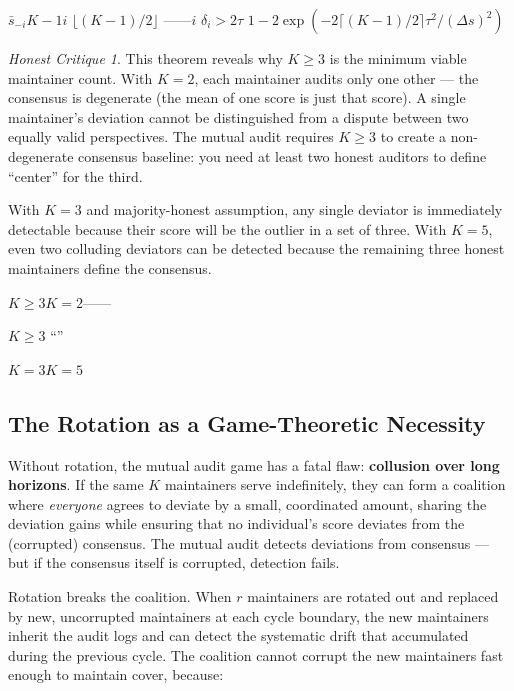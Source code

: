 \documentclass[12pt,a4paper]{article}
\theoremstyle{remark}
\newtheorem{honesthit}{Honest Critique}[section]
\newenvironment{hitbox}{%
  \begin{center}
  \color{red}
  \begin{minipage}{0.92\textwidth}
  \begin{honesthit}
}{%
  \end{honesthit}
  \end{minipage}
  \end{center}
}
\begin{document}
\noindent\textbf{}
$\bar{s}_{-i}$$K-1$\textbf{}$i$
$\lfloor (K-1)/2 \rfloor$
——$i$
$\delta_i > 2\tau$
$1 - 2\exp(-2\lceil (K-1)/2\rceil \tau^2/(\Delta s)^2)$

\begin{hitbox}
This theorem reveals why $K \geq 3$ is the minimum viable maintainer count.
With $K = 2$, each maintainer audits only one other — the consensus is degenerate
(the mean of one score is just that score). A single maintainer's deviation cannot
be distinguished from a dispute between two equally valid perspectives. The
mutual audit requires $K \geq 3$ to create a non-degenerate consensus baseline:
you need at least two honest auditors to define ``center'' for the third.

With $K = 3$ and majority-honest assumption, any single deviator is immediately
detectable because their score will be the outlier in a set of three. With
$K = 5$, even two colluding deviators can be detected because the remaining
three honest maintainers define the consensus.

\begin{center}
\small\textbf{}
$K \geq 3$$K=2$——

$K \geq 3$
“”

$K=3$$K=5$

\end{center}
\end{hitbox}

\subsection{The Rotation as a Game-Theoretic Necessity}

Without rotation, the mutual audit game has a fatal flaw: \textbf{collusion over
long horizons}. If the same $K$ maintainers serve indefinitely, they can form a
coalition where \textit{everyone} agrees to deviate by a small, coordinated
amount, sharing the deviation gains while ensuring that no individual's score
deviates from the (corrupted) consensus. The mutual audit detects deviations
from consensus — but if the consensus itself is corrupted, detection fails.

Rotation breaks the coalition. When $r$ maintainers are rotated out and replaced
by new, uncorrupted maintainers at each cycle boundary, the new maintainers
inherit the audit logs and can detect the systematic drift that accumulated
during the previous cycle. The coalition cannot corrupt the new maintainers
fast enough to maintain cover, because:
\end{document}
